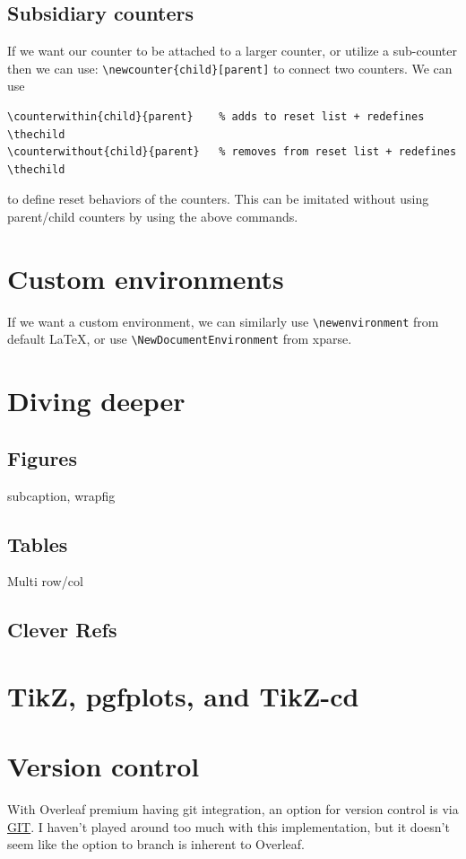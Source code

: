\documentclass[]{article}
\begin{document}
\subsection{Subsidiary counters}
If we want our counter to be attached to a larger counter, or utilize a sub-counter then we can use:
\verb|\newcounter{child}[parent]| to connect two counters. We can use 
\begin{verbatim}
\counterwithin{child}{parent}    % adds to reset list + redefines \thechild
\counterwithout{child}{parent}   % removes from reset list + redefines \thechild    
\end{verbatim}
to define reset behaviors of the counters. This can be imitated without using parent/child counters by using the above commands.

\section{Custom environments}\label{sec:Environs}
If we want a custom environment, we can similarly use \verb|\newenvironment| from default LaTeX, or use \verb|\NewDocumentEnvironment| from xparse.

\section{Diving deeper}
\subsection{Figures}
subcaption, wrapfig

\subsection{Tables}
Multi row/col
\subsection{Clever Refs}

\section{TikZ, pgfplots, and TikZ-cd}

\section{Version control}
With Overleaf premium having git integration, an option for version control is via \href{https://learngitbranching.js.org/}{GIT}. I haven't played around too much with this implementation, but it doesn't seem like the option to branch is inherent to Overleaf.
\end{document}
